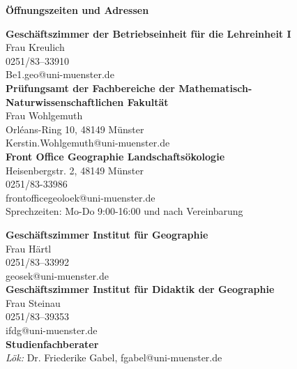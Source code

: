 \begin{center}
\textbf{ Öffnungszeiten und Adressen}
\end{center}
\begin{tiny}
\sffamily
\begin{minipage}[t]{0.5\textwidth}
 \begin{center}
\textbf{Geschäftszimmer der Betriebseinheit für die Lehreinheit I}\\
Frau Kreulich\\
0251/83--33910 \\
Be1.geo@uni-muenster.de\\
\bigskip 
\textbf{Prüfungsamt der Fachbereiche der Mathematisch- Naturwissenschaftlichen Fakultät}\\
Frau Wohlgemuth\\
Orléans-Ring 10, 48149 Münster\\
Kerstin.Wohlgemuth@uni-muenster.de\\
\bigskip
\textbf{Front Office Geographie Landschaftsökologie}\\
Heisenbergstr. 2, 48149 Münster\\
0251/83-33986\\
frontofficegeoloek@uni-muenster.de\\
Sprechzeiten: Mo-Do 9:00-16:00 und nach Vereinbarung
\bigskip         	
\end{center}
\end{minipage}
\begin{minipage}[t]{0.5\textwidth}
\begin{center}
 \textbf{Geschäftszimmer Institut für Geographie}\\
  Frau Härtl\\
  0251/83--33992\\
  geosek@uni-muenster.de\\
 \bigskip
\textbf{Geschäftszimmer Institut für Didaktik der Geographie}\\
Frau Steinau\\
0251/83--39353\\
ifdg@uni-muenster.de\\
\bigskip
\textbf{Studienfachberater}\\
\textit{Lök:} Dr. Friederike Gabel, fgabel@uni-muenster.de\\

\end{center}
\end{minipage}
\end{tiny}
